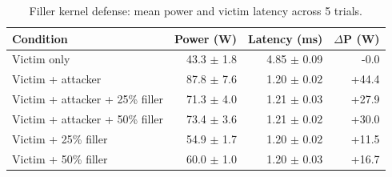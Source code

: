 \begin{table}[t]
  \centering
  \caption{Filler kernel defense: mean power and victim latency across 5 trials.}
  \label{tab:filler_defense}
  \small
  \begin{tabular}{lrrr}
    \toprule
    Condition & Power (W) & Latency (ms) & $\Delta$P (W) \\
    \midrule
    Victim only & 43.3 $\pm$ 1.8 & 4.85 $\pm$ 0.09 & -0.0 \\
    Victim + attacker & 87.8 $\pm$ 7.6 & 1.20 $\pm$ 0.02 & +44.4 \\
    Victim + attacker + 25\% filler & 71.3 $\pm$ 4.0 & 1.21 $\pm$ 0.03 & +27.9 \\
    Victim + attacker + 50\% filler & 73.4 $\pm$ 3.6 & 1.21 $\pm$ 0.02 & +30.0 \\
    Victim + 25\% filler & 54.9 $\pm$ 1.7 & 1.20 $\pm$ 0.02 & +11.5 \\
    Victim + 50\% filler & 60.0 $\pm$ 1.0 & 1.20 $\pm$ 0.03 & +16.7 \\
    \bottomrule
  \end{tabular}
\end{table}